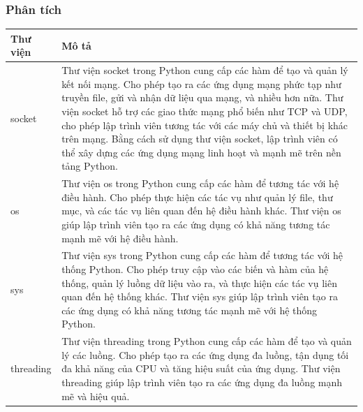 \documentclass[a4paper]{article}
\begin{document}
\subsubsection{Phân tích}
\newpage
\begin{table}[h]
	\centering
	\begin{tabular}{|l|p{10cm}|}
		\hline
		\textbf{Thư viện} & \textbf{Mô tả}                                                                                                                                                                                                                                                                                                                                                                                                                                                            \\
		\hline
		socket            & Thư viện socket trong Python cung cấp các hàm để tạo và quản lý kết nối mạng. Cho phép tạo ra các ứng dụng mạng phức tạp như truyền file, gửi và nhận dữ liệu qua mạng, và nhiều hơn nữa. Thư viện socket hỗ trợ các giao thức mạng phổ biến như TCP và UDP, cho phép lập trình viên tương tác với các máy chủ và thiết bị khác trên mạng. Bằng cách sử dụng thư viện socket, lập trình viên có thể xây dựng các ứng dụng mạng linh hoạt và mạnh mẽ trên nền tảng Python. \\
		\hline
		os                & Thư viện os trong Python cung cấp các hàm để tương tác với hệ điều hành. Cho phép thực hiện các tác vụ như quản lý file, thư mục, và các tác vụ liên quan đến hệ điều hành khác. Thư viện os giúp lập trình viên tạo ra các ứng dụng có khả năng tương tác mạnh mẽ với hệ điều hành.                                                                                                                                                                                      \\
		\hline
		sys               & Thư viện sys trong Python cung cấp các hàm để tương tác với hệ thống Python. Cho phép truy cập vào các biến và hàm của hệ thống, quản lý luồng dữ liệu vào ra, và thực hiện các tác vụ liên quan đến hệ thống khác. Thư viện sys giúp lập trình viên tạo ra các ứng dụng có khả năng tương tác mạnh mẽ với hệ thống Python.                                                                                                                                               \\
		\hline
		threading         & Thư viện threading trong Python cung cấp các hàm để tạo và quản lý các luồng. Cho phép tạo ra các ứng dụng đa luồng, tận dụng tối đa khả năng của CPU và tăng hiệu suất của ứng dụng. Thư viện threading giúp lập trình viên tạo ra các ứng dụng đa luồng mạnh mẽ và hiệu quả.                                                                                                                                                                                            \\

\end{tabular}
\end{table}
\end{document}
